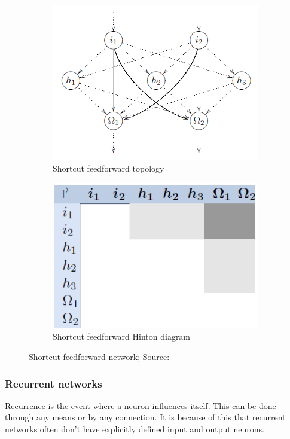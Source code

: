 \documentclass[pdftex,a4paper,12pt,twoside]{report}
\theoremstyle{plain} \newtheorem{theorem}{Theorem} \newtheorem{proposition}{Proposition} \newtheorem{lemma}{Lemma} \newtheorem*{corollary}{Corollary}
\theoremstyle{definition} \newtheorem{definition}{Definition} \newtheorem{conjecture}{Conjecture} \newtheorem*{example}{Example} \newtheorem{algorithm}{Algorithm}
\theoremstyle{remark} \newtheorem*{remark}{Remark} \newtheorem*{note}{Note} \newtheorem{case}{Case}
\begin{document}
\begin{figure}
\centering
	\begin{subfigure}[b]{0.49\textwidth}
	\centering
	\includegraphics[width=\textwidth]{./img/Feedforward-shortcut-Topology.png}
	\caption{Shortcut feedforward topology}
	\end{subfigure}
	\begin{subfigure}[b]{0.49\textwidth}
	\centering
	\includegraphics[width=\textwidth]{./img/Feedforward-shortcut-Hinton.png}
	\caption{Shortcut feedforward Hinton diagram}
	\end{subfigure}
\caption{Shortcut feedforward network; Source:\citep{Kriesel2013}}
\label{fig:shortcutfeedforward}
\end{figure}
\subsubsection{Recurrent networks}
Recurrence is the event where a neuron influences itself. This can be done through any means or by any connection. It is because of this that recurrent networks often don't have explicitly defined input and output neurons.
\end{document}
